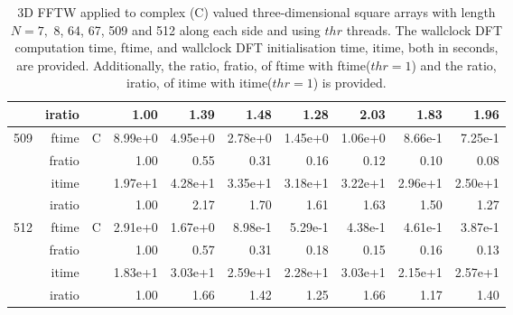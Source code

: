 \documentclass[a4paper]{article}
\begin{document}
\begin{table}[htbp]
\begin{center}
\begin{small}
\begin{tabular}{|r|r|r|r|r|r|r|r|r|r|}
     & iratio & &      1.00 &   1.39 &   1.48 &   1.28 &   2.03 &   1.83 &   1.96       \\ \hline 
  509  & ftime & C  &  8.99e+0 &   4.95e+0 &   2.78e+0 &   1.45e+0 &   1.06e+0 &   8.66e-1 &   7.25e-1    \\ 
      & fratio & &     1.00 &   0.55 &   0.31 &   0.16 &   0.12 &   0.10 &   0.08    \\ 
     & itime & &       1.97e+1 &   4.28e+1 &   3.35e+1 &   3.18e+1 &   3.22e+1 &   2.96e+1 &   2.50e+1       \\ 
     & iratio & &      1.00 &   2.17 &   1.70 &   1.61 &   1.63 &   1.50 &   1.27       \\ \hline 
  512  & ftime & C  &  2.91e+0 &   1.67e+0 &   8.98e-1 &   5.29e-1 &   4.38e-1 &   4.61e-1 &   3.87e-1     \\ 
      & fratio & &     1.00 &   0.57 &   0.31 &   0.18 &   0.15 &   0.16 &   0.13       \\ 
     & itime & &       1.83e+1 &   3.03e+1 &   2.59e+1 &   2.28e+1 &   3.03e+1 &   2.15e+1 &   2.57e+1       \\ 
     & iratio & &      1.00 &   1.66 &   1.42 &   1.25 &   1.66 &   1.17 &   1.40       \\ \hline
\end{tabular}
\caption{3D FFTW applied to complex (C) valued three-dimensional square arrays with length
  $N=7,$ 8, 64, 67, 509 and 512 along each side and using $thr$ threads. The wallclock DFT computation time,
  ftime, and wallclock DFT initialisation time, itime, both in seconds, are provided. Additionally,  the ratio,
  fratio, of ftime  with ftime($thr=1$) and the ratio, iratio, of itime  with itime($thr=1$) is provided. }\label{Tbl:FFTW3dc}
\end{small}
\end{center}
\end{table}
\end{document}
